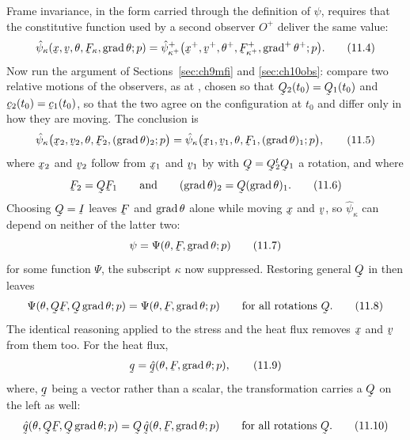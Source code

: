 Frame invariance, in the form  carried through the definition
 of $\psi$, requires that the constitutive function used by a
second observer $O^{+}$ deliver the same value:
\begin{equation}
   \hat\psi_{\kappa}(\bx,\bv,\theta,\bF_{\kappa},\grad\theta;p)
   =\hat\psi^{+}_{\kappa^{+}}\big(\bx^{+},\bv^{+},\theta^{+},
   \bF^{+}_{\kappa^{+}},\grad^{+}\theta^{+};p\big).
   \tag{11.4}\label{eq:11.4}
\end{equation}
Now run the argument of Sections~\ref{sec:ch9mfi} and
\ref{sec:ch10obs}: compare two relative motions of the observers, as at
, chosen so that $\bQ_{2}(t_{0})=\bQ_{1}(t_{0})$ and
$\bc_{2}(t_{0})=\bc_{1}(t_{0})$, so that the two agree on the
configuration at $t_{0}$ and differ only in how they are moving. The
conclusion is
\begin{equation}
   \hat\psi_{\kappa}\big(\bx_{2},\bv_{2},\theta,\bF_{2},
   (\grad\theta)_{2};p\big)
   =\hat\psi_{\kappa}\big(\bx_{1},\bv_{1},\theta,\bF_{1},
   (\grad\theta)_{1};p\big),
   \tag{11.5}\label{eq:11.5}
\end{equation}
where $\bx_{2}$ and $\bv_{2}$ follow from $\bx_{1}$ and $\bv_{1}$ by
 with $\bQ=\bQ^{t}_{2}\bQ_{1}$ a rotation, and where
\begin{equation}
   \bF_{2}=\bQ\bF_{1}\qquad\text{and}\qquad
   (\grad\theta)_{2}=\bQ(\grad\theta)_{1}.
   \tag{11.6}\label{eq:11.6}
\end{equation}
Choosing $\bQ=\I$ leaves $\bF$ and $\operatorname{grad}\theta$ alone while moving
$\bx$ and $\bv$, so $\hat\psi_{\kappa}$ can depend on neither of the
latter two:
\begin{equation}
   \psi=\Psi(\theta,\bF,\grad\theta;p)
   \tag{11.7}\label{eq:11.7}
\end{equation}
for some function $\Psi$, the subscript $\kappa$ now suppressed.
Restoring general $\bQ$ in  then leaves
\begin{equation}
   \Psi(\theta,\bQ\bF,\bQ\grad\theta;p)=\Psi(\theta,\bF,\grad\theta;p)
   \qquad\text{for all rotations }\bQ .
   \tag{11.8}\label{eq:11.8}
\end{equation}
The identical reasoning applied to the stress and the heat flux removes
$\bx$ and $\bv$ from them too. For the heat flux,
\begin{equation}
   \bq=\hat\bq(\theta,\bF,\grad\theta;p),
   \tag{11.9}\label{eq:11.9}
\end{equation}
where, $\bq$ being a vector rather than a scalar, the transformation
carries a $\bQ$ on the left as well:
\begin{equation}
   \hat\bq(\theta,\bQ\bF,\bQ\grad\theta;p)
   =\bQ\,\hat\bq(\theta,\bF,\grad\theta;p)
   \qquad\text{for all rotations }\bQ .
   \tag{11.10}\label{eq:11.10}
\end{equation}

